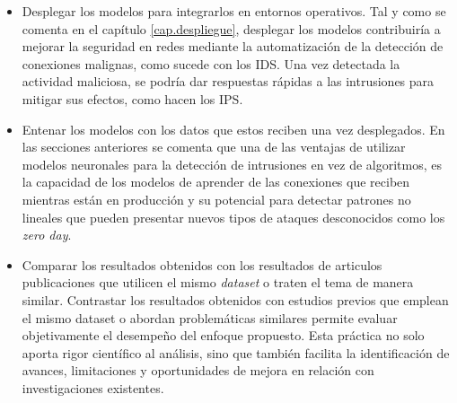 \begin{itemize}
	\item Desplegar los modelos para integrarlos en entornos operativos. Tal y como se comenta en el capítulo \ref{cap.despliegue}, desplegar los modelos contribuiría a mejorar la seguridad en redes mediante la automatización de la detección de conexiones malignas, como sucede con los IDS. Una vez detectada la actividad maliciosa, se podría dar respuestas rápidas a las intrusiones para mitigar sus efectos, como hacen los IPS.
	
	\item Entenar los modelos con los datos que estos reciben una vez desplegados. En las secciones anteriores se comenta que una de las ventajas de utilizar modelos neuronales para la detección de intrusiones en vez de algoritmos, es la capacidad de los modelos de aprender de las conexiones que reciben mientras están en producción y su potencial para detectar patrones no lineales que pueden presentar nuevos tipos de ataques desconocidos como los \textit{zero day}.
	
	\item Comparar los resultados obtenidos con los resultados de articulos publicaciones que utilicen el mismo \textit{dataset} o traten el tema de manera similar. Contrastar los resultados obtenidos con estudios previos que emplean el mismo dataset o abordan problemáticas similares permite evaluar objetivamente el desempeño del enfoque propuesto. Esta práctica no solo aporta rigor científico al análisis, sino que también facilita la identificación de avances, limitaciones y oportunidades de mejora en relación con investigaciones existentes.
\end{itemize}



